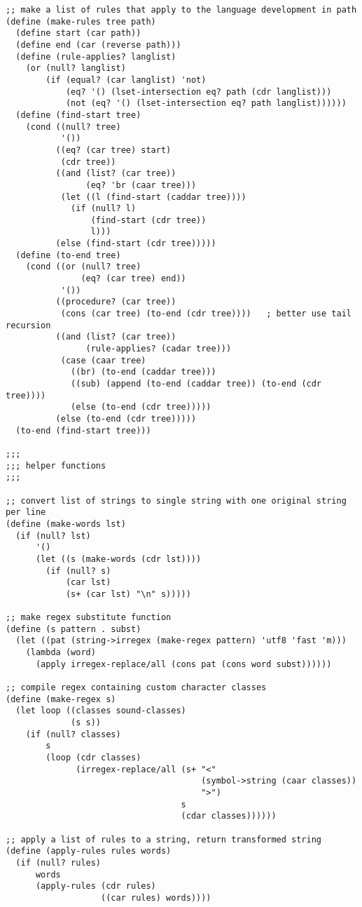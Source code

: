 \begin{verbatim}
;; make a list of rules that apply to the language development in path
(define (make-rules tree path)
  (define start (car path))
  (define end (car (reverse path)))
  (define (rule-applies? langlist)
    (or (null? langlist)
        (if (equal? (car langlist) 'not)
            (eq? '() (lset-intersection eq? path (cdr langlist)))
            (not (eq? '() (lset-intersection eq? path langlist))))))
  (define (find-start tree)
    (cond ((null? tree)
           '())
          ((eq? (car tree) start)
           (cdr tree))
          ((and (list? (car tree))
                (eq? 'br (caar tree)))
           (let ((l (find-start (caddar tree))))
             (if (null? l)
                 (find-start (cdr tree))
                 l)))
          (else (find-start (cdr tree)))))
  (define (to-end tree)
    (cond ((or (null? tree)
               (eq? (car tree) end))
           '())
          ((procedure? (car tree))
           (cons (car tree) (to-end (cdr tree))))   ; better use tail recursion
          ((and (list? (car tree))
                (rule-applies? (cadar tree)))
           (case (caar tree)
             ((br) (to-end (caddar tree)))
             ((sub) (append (to-end (caddar tree)) (to-end (cdr tree))))
             (else (to-end (cdr tree)))))
          (else (to-end (cdr tree)))))
  (to-end (find-start tree)))

;;;
;;; helper functions
;;;

;; convert list of strings to single string with one original string per line
(define (make-words lst)
  (if (null? lst)
      '()
      (let ((s (make-words (cdr lst))))
        (if (null? s)
            (car lst)
            (s+ (car lst) "\n" s)))))

;; make regex substitute function
(define (s pattern . subst)
  (let ((pat (string->irregex (make-regex pattern) 'utf8 'fast 'm)))
    (lambda (word)
      (apply irregex-replace/all (cons pat (cons word subst))))))

;; compile regex containing custom character classes
(define (make-regex s)
  (let loop ((classes sound-classes)
             (s s))
    (if (null? classes)
        s
        (loop (cdr classes)
              (irregex-replace/all (s+ "<"
                                       (symbol->string (caar classes))
                                       ">")
                                   s
                                   (cdar classes))))))

;; apply a list of rules to a string, return transformed string
(define (apply-rules rules words)
  (if (null? rules)
      words
      (apply-rules (cdr rules)
                   ((car rules) words))))


\end{verbatim}
